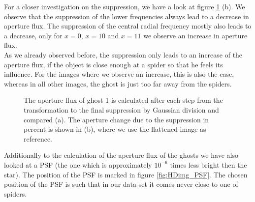 For a closer investigation on the suppression, we have a look at figure \ref{fig:Ghost1_apertures} (b). We observe that the suppression of the lower frequencies always lead to a decrease in aperture flux. The suppression of the central radial frequency mostly also leads to a decrease, only for $x=0$, $x=10$ and $x=11$ we observe an increase in aperture flux.\\
As we already observed before, the suppression only leads to an increase of the aperture flux, if the object is close enough at a spider so that he feels its influence. For the images where we observe an increase, this is also the case, whereas in all other images, the ghost is just too far away from the spiders.\\
\begin{figure}[H]
	\centering
\caption{The aperture flux of ghost 1 is calculated after each step from the transformation to the final suppression by Gaussian division and compared (a). The aperture change due to the suppression in percent is shown in (b), where we use the flattened image as reference.}
\label{fig:Ghost1_apertures}
\end{figure}
Additionally to the calculation of the aperture flux of the ghosts we have also looked at a PSF (the one which is approximately $10^{-6}$ times less bright then the star). The position of the PSF is marked in figure \ref{fig:HDimg_PSF}. The chosen position of the PSF is such that in our data-set it comes never close to one of spiders. 
